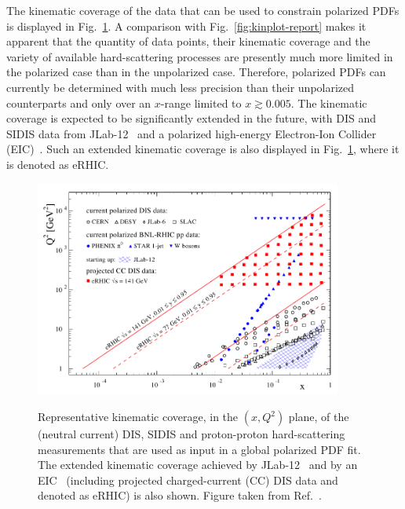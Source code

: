 The kinematic coverage of the data that can be used to constrain polarized 
PDFs is displayed in Fig.~\ref{fig:kinEIC}.
%
A comparison with Fig.~\ref{fig:kinplot-report} makes it apparent that the
quantity of data points, their kinematic coverage and the variety of 
available hard-scattering processes are presently much more limited in the 
polarized case than in the unpolarized case.
%
Therefore, polarized PDFs can currently be determined with much less 
precision than their unpolarized counterparts and only over an $x$-range limited
to $x\gtrsim 0.005$.
%
The kinematic coverage is expected to be significantly extended in the future,
with DIS and SIDIS data from JLab-12~\cite{Dudek:2012vr} and a polarized 
high-energy Electron-Ion Collider (EIC)~\cite{Accardi:2012qut}.
%
Such an extended kinematic coverage is also displayed in Fig.~\ref{fig:kinEIC},
where it is denoted as eRHIC.

\begin{figure}[!t]
\centering
\includegraphics[width=0.9\textwidth]{plots/kinEIC}\\
\caption{\small Representative kinematic coverage, in the $(x,Q^2)$ plane,
of the (neutral current) DIS, SIDIS and proton-proton hard-scattering 
measurements that are used as input in a global polarized PDF fit.
%
The extended kinematic coverage achieved by 
JLab-12~\cite{Dudek:2012vr} and by an EIC~\cite{Accardi:2012qut}
(including projected charged-current (CC) DIS data and denoted as eRHIC) 
is also shown.
%
Figure taken from Ref.~\cite{Aschenauer:2014cki}.}
\label{fig:kinEIC}
\end{figure}

